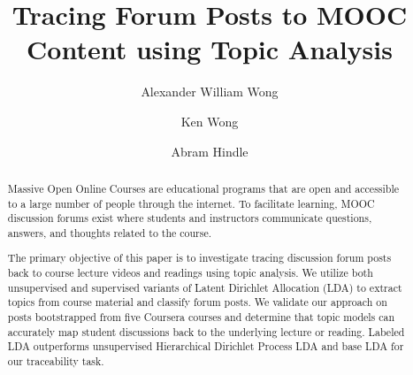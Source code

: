 \documentclass[sigconf, anonymous]{acmart}
\begin{document}
%
\title{Tracing Forum Posts to MOOC Content using Topic Analysis} %

%
\author{Alexander William Wong}

\author{Ken Wong}

\author{Abram Hindle}

%

\begin{abstract}
Massive Open Online Courses are educational programs that are open and accessible to a large number of people through the internet.
To facilitate learning, MOOC discussion forums exist where students and instructors communicate questions, answers, and thoughts related to the course.

The primary objective of this paper is to investigate tracing discussion forum posts back to course lecture videos and readings using topic analysis. We utilize both unsupervised and supervised variants of Latent Dirichlet Allocation (LDA) to extract topics from course material and classify forum posts.
We validate our approach on posts bootstrapped from five
Coursera courses and determine that topic models can accurately map student discussions back to the underlying lecture or reading. Labeled LDA outperforms unsupervised Hierarchical Dirichlet Process LDA and base LDA for our traceability task.

\end{abstract}
\end{document}
